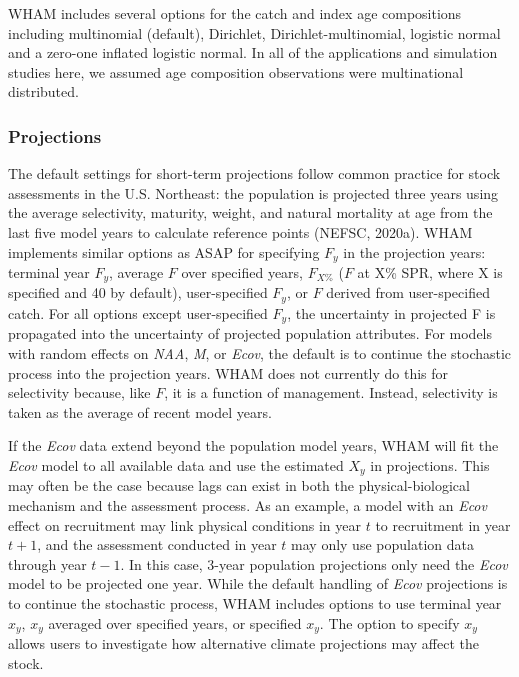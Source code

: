\documentclass[]{article}
\begin{document}
WHAM includes several options for the catch and index age compositions
including multinomial (default), Dirichlet, Dirichlet-multinomial,
logistic normal and a zero-one inflated logistic normal. In all of the
applications and simulation studies here, we assumed age composition
observations were multinational distributed.

\hypertarget{projections}{%
\subsubsection{Projections}\label{projections}}

The default settings for short-term projections follow common practice
for stock assessments in the U.S. Northeast: the population is projected
three years using the average selectivity, maturity, weight, and natural
mortality at age from the last five model years to calculate reference
points (NEFSC, 2020a). WHAM implements similar options as ASAP for
specifying \(F_y\) in the projection years: terminal year \(F_y\),
average \(F\) over specified years, \(F_{X\%}\) (\(F\) at X\% SPR, where
X is specified and 40 by default), user-specified \(F_y\), or \(F\)
derived from user-specified catch. For all options except user-specified
\(F_y\), the uncertainty in projected F is propagated into the
uncertainty of projected population attributes. For models with random
effects on \emph{NAA}, \emph{M}, or \emph{Ecov}, the default is to
continue the stochastic process into the projection years. WHAM does not
currently do this for selectivity because, like \(F\), it is a function
of management. Instead, selectivity is taken as the average of recent
model years.

If the \emph{Ecov} data extend beyond the population model years, WHAM
will fit the \emph{Ecov} model to all available data and use the
estimated \(X_y\) in projections. This may often be the case because
lags can exist in both the physical-biological mechanism and the
assessment process. As an example, a model with an \emph{Ecov} effect on
recruitment may link physical conditions in year \(t\) to recruitment in
year \(t+1\), and the assessment conducted in year \(t\) may only use
population data through year \(t-1\). In this case, 3-year population
projections only need the \emph{Ecov} model to be projected one year.
While the default handling of \emph{Ecov} projections is to continue the
stochastic process, WHAM includes options to use terminal year \(x_y\),
\(x_y\) averaged over specified years, or specified \(x_y\). The option
to specify \(x_y\) allows users to investigate how alternative climate
projections may affect the stock.
\end{document}
